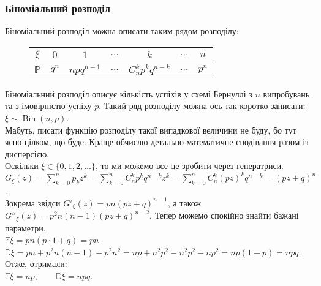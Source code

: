 \documentclass[a4paper, 10pt]{article}
\theoremstyle{theoremdd}
\DeclareMathOperator{\Bin}{Bin}
\begin{document}
\subsubsection{Біноміальний розподіл}
Біноміальний розподіл можна описати таким рядом розподілу:
\begin{figure}[H]
\centering
\begin{tabular}{c|c|c|c|c|c|c}
$\xi$ & $0$ & $1$ & $\dots$ & $k$ & $\dots$ & $n$ \\
\hline
$\mathbb{P}$ & $q^n$ & $n p q^{n-1}$ & $\dots$ & $C_n^k p^k q^{n-k}$ & $\dots$ & $p^n$
\end{tabular}
\end{figure}
\noindent
Біноміальний розподіл описує кількість успіхів у схемі Бернуллі з $n$ випробувань та з імовірністю успіху $p$. Такий ряд розподілу можна ось так коротко записати: $\xi \sim \Bin(n,p)$.\\
Мабуть, писати функцію розподілу такої випадкової величини не буду, бо тут ясно цілком, що буде. Краще обчислю детально математичне сподівання разом із дисперсією.\\
Оскільки $\xi \in \{0,1,2,\dots\}$, то ми можемо все це зробити через генератриси.\\
$G_\xi(z) = \displaystyle\sum_{k=0}^n p_k z^k = \displaystyle\sum_{k=0}^n C_n^k p^k q^{n-k} z^k = \sum_{k=0}^n C_n^k (pz)^k q^{n-k} = (pz+q)^n$.\\
Зокрема звідси $G'_\xi(z) = pn(pz+q)^{n-1}$, а також $G''_\xi(z) = p^2 n(n-1)(pz+q)^{n-2}$. Тепер можемо спокійно знайти бажані параметри.\\
$\mathbb{E}\xi = pn(p \cdot 1 + q) = pn$.\\
$\mathbb{D}\xi = pn + p^2n(n-1) - p^2n^2 = np + n^2p^2 - n^2p^2 -np^2 = np(1-p) = npq$.\\
Отже, отримали:\\
$\mathbb{E}\xi = np, \qquad \mathbb{D}\xi = npq$.
\end{document}
